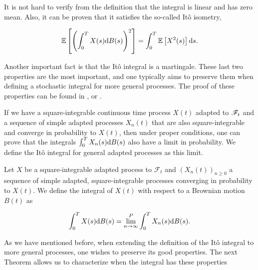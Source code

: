 It is not hard to verify from the definition that the integral is linear and has zero mean. Also, it can be proven that it satisfies the so-called Itô isometry,

\begin{equation*}
    \mathbb E \left[  \left( \int_0^T X(s) \mathrm d B(s)\right)^2  \right] = \int_0^T \mathbb E \left[ X^2(s) \right] \mathrm d s.
\end{equation*}

Another important fact is that the Itô integral is a martingale. These last two properties are the most important, and one typically aims to preserve them when defining a stochastic integral for more general processes. The proof of these properties can be found in \cite{book:legall}, \cite{book:klebaner} or \cite{book:karatzas}.

If we have a square-integrable continuous time process $X(t)$ adapted to $\mathscr F_t$ and a sequence of simple adapted processes $X_n(t)$ that are also square-integrable and converge in probability to $X(t)$, then under proper conditions, one can prove that the integrals $\int_0^T X_n(s)\mathrm d B(s)$ also have a limit in probability. We define the Itô integral for general adapted processes as this limit.

\begin{definition}
    Let $X$ be a square-integrable adapted process to $\mathscr F_t$ and $(X_n(t))_{n\ge 0}$ a sequence of simple adapted, square-integrable processes converging in probability to $X(t)$. We define the integral of $X(t)$ with respect to a Brownian motion $B(t)$ as

    \begin{equation*}
        \int_0^T X(s) \mathrm d B(s) = \lim_{n\to\infty}^P \int_0^T X_n(s) \mathrm d B(s).
    \end{equation*}
\end{definition}

As we have mentioned before, when extending the definition of the Itô integral to more general processes, one wishes to preserve its good properties. The next Theorem allows us to characterize when the integral has these properties

